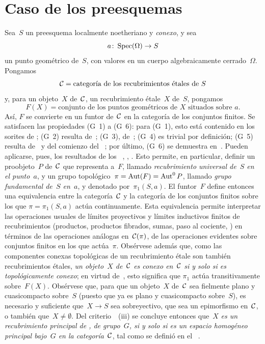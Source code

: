 \section{Caso de los preesquemas}
\label{V.7}
Sea~$S$ un preesquema localmente noetheriano y \emph{conexo}, y sea
$$
a\colon \Spec(\Omega)\to S
$$
un punto geométrico de~$S$, con valores en un cuerpo algebraicamente
cerrado~$\Omega$. Pongamos
$$
\cal{C}=\text{categoría de los recubrimientos étales de~$S$}
$$
y, para un objeto~$X$ de~$\cal{C}$, \ie un recubrimiento étale~$X$
de~$S$, pongamos
$$
F(X)=\text{conjunto de los puntos geométricos de~$X$ situados sobre~$a$.}
$$
Así, $F$ se convierte en un funtor de~$\cal{C}$ en la categoría de los
conjuntos finitos. Se satisfacen las propiedades (G~1)
a (G~6): para (G~1), esto está contenido en los sorites de
; (G~2) resulta de~; (G~3), de~;
(G~4) es trivial por definición; (G~5) resulta de~ y del
comienzo del \No~; por último, (G~6) se demuestra
en~. Pueden aplicarse, pues, los resultados de los
\No~, , . Esto permite, en particular,
definir un proobjeto~$P$ de~$\cal{C}$ que representa a~$F$, llamado
\emph{recubrimiento universal de~$S$ en el punto~$a$},
%
y un grupo topológico~$\pi=\Aut(F)=\Aut^0 P$, llamado
\emph{grupo fundamental de~$S$ en~$a$},
%
y denotado por~$\pi_1(S,a)$.
\label{indnot:eg}%
El funtor~$F$ define entonces una equivalencia entre la categoría~$\cal{C}$
y la categoría de los conjuntos finitos sobre los que
$\pi=\pi_1(S,a)$ actúa continuamente. Esta equivalencia permite interpretar
las operaciones usuales de límites proyectivos y límites inductivos finitos
de recubrimientos (productos, productos fibrados, sumas, paso al cociente,
) en términos de las operaciones
análogas en~$\cal{C}(\pi)$, \ie de las operaciones evidentes sobre conjuntos
finitos en los que actúa~$\pi$. Obsérvese además que, como las componentes
conexas topológicas de un recubrimiento étale son también recubrimientos
étales, \emph{un objeto~$X$ de~$\cal{C}$ es conexo en~$\cal{C}$ si y solo si
es topológicamente conexo}; en virtud de~, esto significa que
$\pi_1$ actúa transitivamente sobre~$F(X)$.
%
Obsérvese que, para que un objeto~$X$ de~$\cal{C}$ sea fielmente plano y
cuasicompacto sobre~$S$ (puesto que ya es plano y cuasicompacto sobre~$S$),
es necesario y suficiente que~$X\to S$ sea sobreyectivo, \ie que sea un
epimorfismo en~$\cal{C}$, o también que~$X\neq\emptyset$. Del
criterio~~(iii) se concluye entonces que~$X$
\emph{es un recubrimiento principal de
,
de grupo~$G$, si y solo si es un espacio homogéneo principal bajo~$G$ en
la categoría~$\cal{C}$}, tal como se definió en el \No~.

